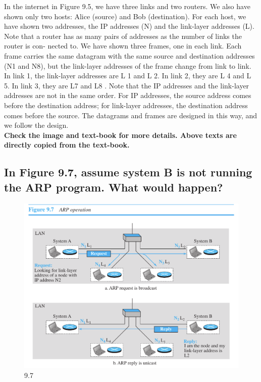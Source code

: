 \documentclass{article}
\begin{document}
In the internet in Figure 9.5, we have three links and two routers. We also have
shown only two hosts: Alice (source) and Bob (destination). For each host, we have
shown two addresses, the IP addresses (N) and the link-layer addresses (L). Note
that a router has as many pairs of addresses as the number of links the router is con-
nected to. We have shown three frames, one in each link. Each frame carries the
same datagram with the same source and destination addresses (N1 and N8), but the
link-layer addresses of the frame change from link to link. In link 1, the link-layer
addresses are L 1 and L 2. In link 2, they are L 4 and L 5. In link 3, they are L7 and L8 .
Note that the IP addresses and the link-layer addresses are not in the same order. For
IP addresses, the source address comes before the destination address; for link-layer
addresses, the destination address comes before the source. The datagrams and frames are designed in this way, and we follow the design. \\

\textbf{Check the image and text-book for more details. Above texts are directly copied from the text-book.}

\subsection{
	In Figure 9.7, assume system B is not running the ARP program. What would
	happen?
}
\begin{figure}[H]
	\center
	\includegraphics[scale=0.5]{9.7.png}
	\caption{9.7}
\end{figure}
\end{document}
